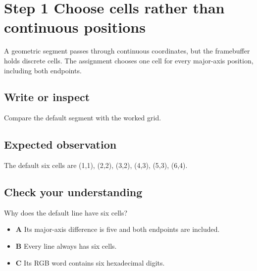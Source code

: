 \section{Step 1 Choose cells rather than continuous
  positions}\label{007-bresenham-line-s01-step-1-choose-cells-rather-than-continuous-positions}

A geometric segment passes through continuous coordinates, but the
framebuffer holds discrete cells. The assignment chooses one cell for
every major-axis position, including both endpoints.

\subsection{Write or
  inspect}\label{007-bresenham-line-s01-write-or-inspect}

Compare the default segment with the worked grid.

\subsection{Expected
  observation}\label{007-bresenham-line-s01-expected-observation}

The default six cells are (1,1), (2,2), (3,2), (4,3), (5,3), (6,4).

\subsection{Check your
  understanding}\label{007-bresenham-line-s01-check-your-understanding}

Why does the default line have six cells?

\begin{itemize}
  \tightlist
  \item
        \textbf{A} Its major-axis difference is five and both endpoints are
        included.
  \item
        \textbf{B} Every line always has six cells.
  \item
        \textbf{C} Its RGB word contains six hexadecimal digits.
\end{itemize}
